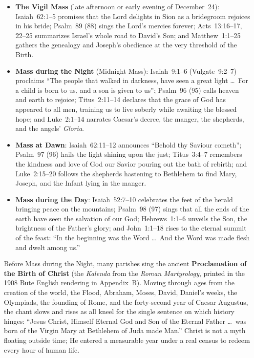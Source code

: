 \begin{itemize}
  \item \textbf{The Vigil Mass} (late afternoon or early evening of December~24): Isaiah~62:1--5 promises that the Lord delights in Sion as a bridegroom rejoices in his bride; Psalm~89 (88) sings the Lord's mercies forever; Acts~13:16--17, 22--25 summarizes Israel's whole road to David's Son; and Matthew~1:1--25 gathers the genealogy and Joseph's obedience at the very threshold of the Birth.
  \item \textbf{Mass during the Night} (Midnight Mass): Isaiah~9:1--6 (Vulgate~9:2--7) proclaims ``The people that walked in darkness, have seen a great light \dots\ For a child is born to us, and a son is given to us''; Psalm~96 (95) calls heaven and earth to rejoice; Titus~2:11--14 declares that the grace of God has appeared to all men, training us to live soberly while awaiting the blessed hope; and Luke~2:1--14 narrates Caesar's decree, the manger, the shepherds, and the angels' \textit{Gloria}.
  \item \textbf{Mass at Dawn}: Isaiah~62:11--12 announces ``Behold thy Saviour cometh''; Psalm~97 (96) hails the light shining upon the just; Titus~3:4--7 remembers the kindness and love of God our Savior pouring out the bath of rebirth; and Luke~2:15--20 follows the shepherds hastening to Bethlehem to find Mary, Joseph, and the Infant lying in the manger.
  \item \textbf{Mass during the Day}: Isaiah~52:7--10 celebrates the feet of the herald bringing peace on the mountains; Psalm~98 (97) sings that all the ends of the earth have seen the salvation of our God; Hebrews~1:1--6 unveils the Son, the brightness of the Father's glory; and John~1:1--18 rises to the eternal summit of the feast: ``In the beginning was the Word \dots\ And the Word was made flesh and dwelt among us.''
\end{itemize}

Before Mass during the Night, many parishes sing the ancient \textbf{Proclamation of the Birth of Christ} (the \textit{Kalenda} from the \textit{Roman Martyrology}, printed in the 1908 Bute English rendering in Appendix~B). Moving through ages from the creation of the world, the Flood, Abraham, Moses, David, Daniel's weeks, the Olympiads, the founding of Rome, and the forty-second year of Caesar Augustus, the chant slows and rises as all kneel for the single sentence on which history hinges: ``Jesus Christ, Himself Eternal God and Son of the Eternal Father \dots\ was born of the Virgin Mary at Bethlehem of Juda made Man.'' Christ is not a myth floating outside time; He entered a measurable year under a real census to redeem every hour of human life.

